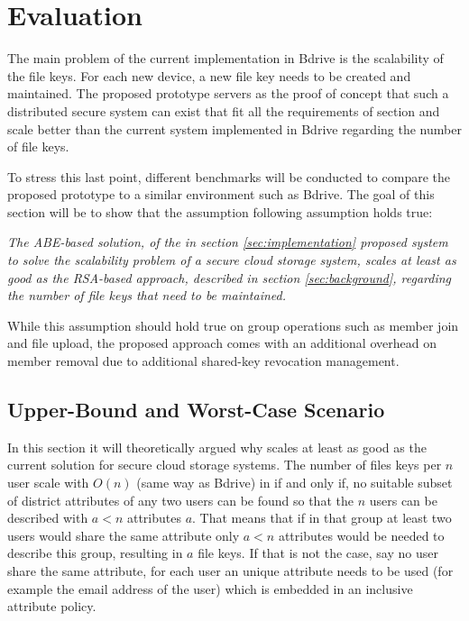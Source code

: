 \chapter{Evaluation}

The main problem of the current implementation in Bdrive is the scalability of the file keys. For each new device, a new file key needs to be created and maintained. The proposed prototype servers as the proof of concept that such a distributed secure system can exist that fit all the requirements of section  and scale better than the current system implemented in Bdrive regarding the number of file keys. 

To stress this last point, different benchmarks will be conducted to compare the proposed prototype to a similar environment such as Bdrive. The goal of this section will be to show that the assumption following assumption holds true:

\begin{center}
\textit{The ABE-based solution, of the in section \ref{sec:implementation} proposed system to solve the scalability problem of a secure cloud storage system, scales at least as good as the RSA-based approach, described in section \ref{sec:background}, regarding the number of file keys that need to be maintained.}
\end{center}

While this assumption should hold true on group operations such as member join and file upload, the proposed approach comes with an additional overhead on member removal due to additional shared-key revocation management. 

\section{Upper-Bound and Worst-Case Scenario}
In this section it will theoretically argued why \name scales at least as good as the current solution for secure cloud storage systems. The number of files keys per $n$ user scale with $O(n)$ (same way as Bdrive) in \name if and only if, no suitable subset of district attributes of any two users can be found so that the $n$ users can be described with $a < n$ attributes $a$. 
That means that if in that group at least two users would share the same attribute only $a < n$ attributes would be needed to describe this group, resulting in $a$ file keys. 
If that is not the case, say no user share the same attribute, for each user an unique attribute needs to be used (for example the email address of the user) which is embedded in an inclusive attribute policy. 

